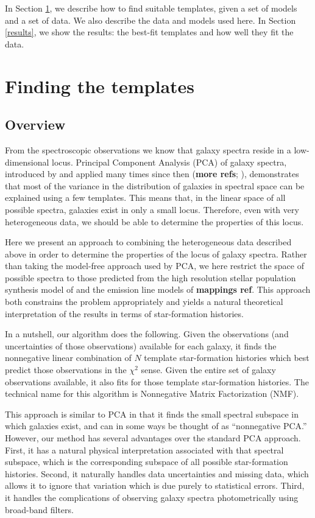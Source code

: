 \documentclass[10pt,preprint]{aastex}
\begin{document}
In Section \ref{algorithm}, we describe how to find suitable
templates, given a set of models and a set of data. We also describe
the data and models used here. In Section \ref{results}, we show the
results: the best-fit templates and how well they fit the data. 


\section{Finding the templates}
\label{algorithm}

\subsection{Overview}

From the spectroscopic observations we know that galaxy spectra reside
in a low-dimensional locus. Principal Component Analysis (PCA) of
galaxy spectra, introduced by \citet{connolly94a} and applied many
times since then ({\bf more refs}; \citealt{yip05a}), demonstrates
that most of the variance in the distribution of galaxies in spectral
space can be explained using a few templates. This means that, in the
linear space of all possible spectra, galaxies exist in only a small
locus. Therefore, even with very heterogeneous data, we should be able
to determine the properties of this locus.

Here we present an approach to combining the heterogeneous data
described above in order to determine the properties of the locus of
galaxy spectra. Rather than taking the model-free approach used by
PCA, we here restrict the space of possible spectra to those predicted
from the high resolution stellar population synthesis model of
\citet{bruzual03a} and the emission line models of {\bf mappings
ref}.  This approach both constrains the problem appropriately and
yields a natural theoretical interpretation of the results in terms of
star-formation histories.

In a nutshell, our algorithm does the following. Given the
observations (and uncertainties of those observations) available for
each galaxy, it finds the nonnegative linear combination of $N$
template star-formation histories which best predict those
observations in the $\chi^2$ sense. Given the entire set of galaxy
observations available, it also fits for those template star-formation
histories. The technical name for this algorithm is Nonnegative Matrix
Factorization (NMF).

This approach is similar to PCA in that it finds the small spectral
subspace in which galaxies exist, and can in some ways be thought of
as ``nonnegative PCA.''  However, our method has several advantages
over the standard PCA approach. First, it has a natural physical
interpretation associated with that spectral subspace, which is the
corresponding subspace of all possible star-formation
histories. Second, it naturally handles data uncertainties and missing
data, which allows it to ignore that variation which is due purely to
statistical errors.  Third, it handles the complications of observing
galaxy spectra photometrically using broad-band filters.
\end{document}
